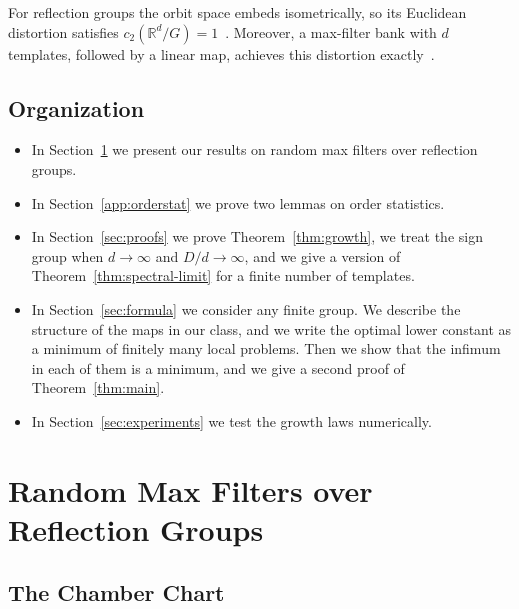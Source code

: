 \documentclass[11pt]{article}
\newcommand{\R}{\mathbb{R}}
\theoremstyle{definition}
\begin{document}
For reflection groups the orbit space embeds isometrically, so its Euclidean distortion
satisfies $c_2(\R^d/G)=1$~\cite{blumsmith2025distortion,cahill2026approx}. Moreover, a
max-filter bank with $d$ templates, followed by a linear map, achieves this distortion
exactly~\cite[Thm.~3]{cahill2026approx}.


\subsection*{Organization}

\begin{itemize}
	\item In Section~\ref{sec:random-maxfilter} we present our results on random max filters
	over reflection groups.
	\item In Section~\ref{app:orderstat} we prove two lemmas on order statistics.
	\item In Section~\ref{sec:proofs} we prove
	Theorem~\ref{thm:growth}, we treat the sign group when $d\to\infty$ and
	$D/d\to\infty$, and we give a version of Theorem~\ref{thm:spectral-limit} for a finite
	number of templates.
	\item In Section~\ref{sec:formula} we consider any finite group. We describe the structure
	of the maps in our class, and we write the optimal lower constant as a minimum of finitely
	many local problems. Then we show that the infimum in each of them is a minimum, and we give
	a second proof of Theorem~\ref{thm:main}. 
	\item In Section~\ref{sec:experiments} we test the growth laws numerically.
\end{itemize}

\section{Random Max Filters over Reflection Groups}
\label{sec:random-maxfilter}




\subsection{The Chamber Chart}\label{subsec:chamber}
\end{document}
